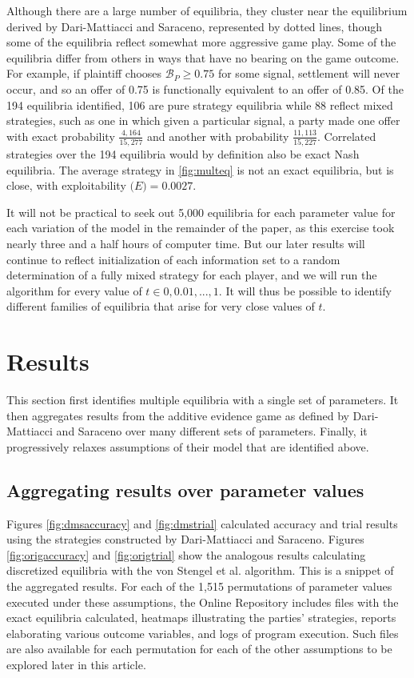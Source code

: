 \documentclass{article}
\begin{document}
Although there are a large number of equilibria, they cluster near the equilibrium derived by Dari-Mattiacci and Saraceno, represented by dotted lines, though some of the equilibria reflect somewhat more aggressive game play. Some of the equilibria differ from others in ways that have no bearing on the game outcome. For example, if plaintiff chooses $\mathcal{B}_P \geq 0.75$ for some signal, settlement will never occur, and so an offer of 0.75 is functionally equivalent to an offer of 0.85. Of the 194 equilibria identified, 106 are pure strategy equilibria while 88 reflect mixed strategies, such as one in which given a particular signal, a party made one offer with exact probability $\frac{4,164}{15,277}$ and another with probability $\frac{11,113}{15,227}$. Correlated strategies over the 194 equilibria would by definition also be exact Nash equilibria. The average strategy in \ref{fig:multeq} is not an exact equilibria, but is close, with exploitability $\mathcal(E)=0.0027$. 

It will not be practical to seek out 5,000 equilibria for each parameter value for each variation of the model in the remainder of the paper, as this exercise took nearly three and a half hours of computer time. But our later results will continue to reflect initialization of each information set to a random determination of a fully mixed strategy for each player, and we will run the algorithm for every value of $t \in {0, 0.01, ..., 1}$. It will thus be possible to identify different families of equilibria that arise for very close values of $t$.

\section{Results} \label{section:Results}

This section first identifies multiple equilibria with a single set of parameters. It then aggregates results from the additive evidence game as defined by Dari-Mattiacci and Saraceno over many different sets of parameters. Finally, it progressively relaxes assumptions of their model that are identified above.

\subsection{Aggregating results over parameter values}

Figures \ref{fig:dmsaccuracy} and \ref{fig:dmstrial} calculated accuracy and trial results using the strategies constructed by Dari-Mattiacci and Saraceno. Figures \ref{fig:origaccuracy} and \ref{fig:origtrial} show the analogous results calculating discretized equilibria with the von Stengel et al. algorithm. This is a snippet of the aggregated results. For each of the 1,515 permutations of parameter values executed under these assumptions, the Online Repository includes files with the exact equilibria calculated, heatmaps illustrating the parties' strategies, reports elaborating various outcome variables, and logs of program execution. Such files are also available for each permutation for each of the other assumptions to be explored later in this article.
\end{document}
